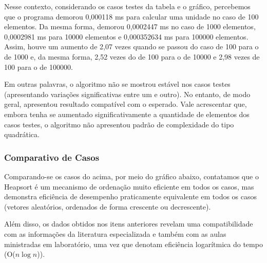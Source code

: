 \documentclass[a4paper, 12pt]{article}
\begin{document}
Nesse contexto, considerando os casos testes da tabela e o gráfico, percebemos que o programa demorou 0,000118 ms para calcular uma unidade no caso de 100 elementos. Da mesma forma, demorou 0,0002447 ms no caso de 1000 elementos, 0,0002981 ms para 10000 elementos e 0,000352634 ms para 100000 elementos. Assim, houve um aumento de 2,07 vezes quando se passou do caso de 100 para o de 1000 e, da mesma forma, 2,52 vezes do de 100 para o de 10000 e 2,98 vezes de 100 para o de 100000.

Em outras palavras, o algoritmo não se mostrou estável nos casos testes (apresentando variações significativas entre um e outro). No entanto, de modo geral, apresentou resultado compatível com o esperado. Vale acrescentar que, embora tenha se aumentado significativamente a quantidade de elementos dos casos testes, o algoritmo não apresentou padrão de complexidade do tipo quadrática.

\subsubsection{Comparativo de Casos}

\tab{ }Comparando-se os casos do acima, por meio do gráfico abaixo, contatamos que o Heapsort é um mecanismo de ordenação muito eficiente em todos os casos, mas demonstra eficiência de desempenho praticamente equivalente em todos os casos (vetores aleatórios, ordenados de forma crescente ou decrescente).

\begin{center}
\end{center}

Além disso, os dados obtidos nos itens anteriores revelam uma compatibilidade com as informações da literatura especializada e também com as aulas ministradas em laboratório, uma vez que denotam eficiência logarítmica do tempo (O($n\log{n}$)).
\end{document}
